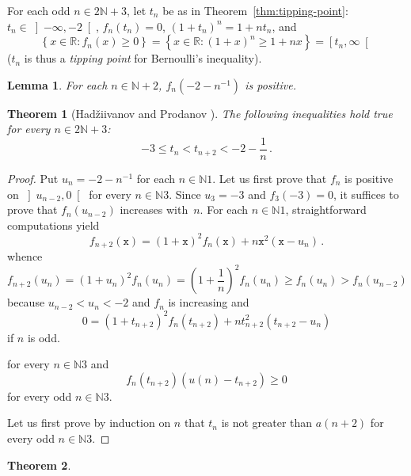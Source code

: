 \documentclass[12pt]{article}
\newcommand{\bR}{\mathbb{R}}
\newcommand{\bN}{\mathbb{N}}
\newcommand{\geint}[1]{\left[ #1, \infty \right[}
\newcommand{\ltint}[1]{\left]- \infty, #1 \right[}
\newcommand{\ttx}{\mathtt{x}}
\newtheorem{theorem}{Theorem}
\newtheorem{lemma}{Lemma}
\begin{document}
 For each odd $n \in 2 \bN + 3$,
 let $t_n$ be as in Theorem~\ref{thm:tipping-point}:
 $t_n \in \ltint{- 2}$, $f_n(t_n) = 0$, ${(1 + t_n)}^n = 1 + n t_n$,
 and 
 $$
 \left\{ x \in \bR : f_n(x) \ge 0 \right\}
 = \left\{ x \in \bR : {(1 + x)}^n \ge 1 + n x  \right\}
 = \geint{t_n} 
 $$
 ($t_n$ is thus a \emph{tipping point} for Bernoulli's inequality).
  
 

 \begin{lemma}
   For each $n \in \bN + 2$, $f_n(- 2 - n^{-1})$ is positive.
 \end{lemma}
 
 
 \begin{theorem} [Had\v{z}iivanov and Prodanov \cite{MitrinovicAI,MitrinovicCNIA}] \label{thm:bulgare}
   The following inequalities hold true for every $n \in 2 \bN + 3$:
   $$ - 3 \le t_n < t_{n + 2} < - 2 - \frac{1}{n} \,.
   $$
 \end{theorem}
 
 \begin{proof}
   Put $u_n = - 2 - n^{-1}$ for each $n \in \bN{1}$.
   Let us first prove that $f_n$ is positive on $\left]u_{n - 2}, 0 \right[$ for every $n \in \bN{3}$.
   Since $u_3 = - 3$ and $f_3(- 3) = 0$, it suffices to prove that $f_n(u_{n - 2})$ increases with~$n$.
   For each $n \in \bN{1}$, straightforward computations yield 
   $$
   f_{n + 2} (\ttx) = {(1 + \ttx)}^2 f_n(\ttx) + n \ttx^2 (\ttx - u_n) \,.
   $$
   whence
   $$
   f_{n + 2}(u_n)
   =
   {(1 + u_n )}^2 f_n(u_n)
   =
   {\left(1 + \frac{1}{n} \right)}^2 f_n(u_n)
   \ge
   f_n(u_n)
   >
   f_n(u_{n - 2})
   $$
   because $u_{n - 2} < u_n < - 2$ and $f_n$ is increasing 
   and
   $$
   0 = {(1 + t_{n + 2})}^2 f_n(t_{n + 2}) +  n t_{n + 2}^2 (t_{n + 2} - u_n)  
   $$
   if $n$ is odd.
   

   
   
 for every $n \in \bN{3}$ and
 $$
 f_n(t_{n + 2})  (u(n) - t_{n + 2})  \ge 0
 $$
 for every odd $n \in \bN{3}$.
 
   Let us first prove by induction on $n$ that $t_n$ is not greater than $a(n + 2)$ for every odd $n \in \bN{3}$.
   
 \end{proof}
 \begin{theorem}
   \label{lem:odd-two-roots}

 \end{theorem}
\end{document}
